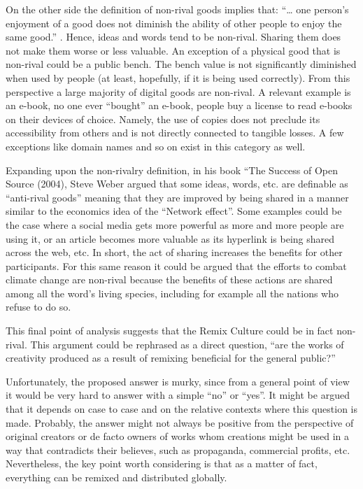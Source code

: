 On the other side the definition of non-rival goods implies that: “… one person’s enjoyment of a good does not diminish the ability of other people to enjoy the same good.” . Hence, ideas and words tend to be non-rival. Sharing them does not make them worse or less valuable. An exception of a physical good that is non-rival could be a public bench. The bench value is not significantly diminished when used by people (at least, hopefully, if it is being used correctly). From this perspective a large majority of digital goods are non-rival. A relevant example is an e-book, no one ever “bought” an e-book, people buy a license to read e-books on their devices of choice. Namely, the use of copies does not preclude its accessibility from others and is not directly connected to tangible losses. A few exceptions like domain names and so on exist in this category as well.

Expanding upon the non-rivalry definition, in his book “The Success of Open Source (2004), Steve Weber argued that some ideas, words, etc. are definable as “anti-rival goods” meaning that they are improved by being shared in a manner similar to the economics idea of the “Network effect”. Some examples could be the case where a social media gets more powerful as more and more people are using it, or an article becomes more valuable as its hyperlink is being shared across the web, etc. In short, the act of sharing increases the benefits for other participants. For this same reason it could be argued that the efforts to combat climate change are non-rival because the benefits of these actions are shared among all the word’s living species, including for example all the nations who refuse to do so. 

This final point of analysis suggests that the Remix Culture could be in fact non-rival. This argument could be rephrased as a direct question, “are the works of creativity produced as a result of remixing beneficial for the general public?”

Unfortunately, the proposed answer is murky, since from a general point of view it would be very hard to answer with a simple “no” or “yes”. It might be argued that it depends on case to case and on the relative contexts where this question is made. Probably, the answer might not always be positive from the perspective of original creators or de facto owners of works whom creations might be used in a way that contradicts their believes, such as propaganda, commercial profits, etc. Nevertheless, the key point worth considering is that as a matter of fact, everything can be remixed and distributed globally.

